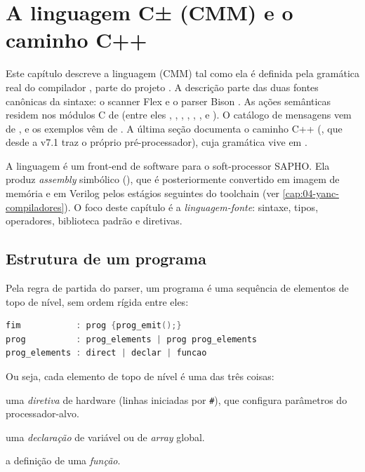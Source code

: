 \chapter{A linguagem C± (CMM) e o caminho C++}
\label{cap:03-linguagem-cmm}

Este capítulo descreve a linguagem \cmm{} (CMM) tal como ela é definida pela
gramática real do compilador , parte do projeto . A
descrição parte das duas fontes canônicas da sintaxe: o scanner Flex
 e o parser Bison
. As ações semânticas residem nos
módulos C de  (entre eles
, , , ,
, ,  e ).
O catálogo de mensagens vem de , e os
exemplos vêm de . A última seção documenta o
caminho C++ (, que desde a v7.1 traz o próprio pré-processador), cuja
gramática vive em
.

\begin{nota}
A linguagem \cmm{} é um front-end de software para o soft-processor SAPHO. Ela
produz \emph{assembly} simbólico (), que é posteriormente convertido
em imagem de memória e em Verilog pelos estágios seguintes do toolchain (ver
\autoref{cap:04-yanc-compiladores}). O foco deste capítulo é a \emph{linguagem-fonte}:
sintaxe, tipos, operadores, biblioteca padrão e diretivas.
\end{nota}

\section{Estrutura de um programa \cmm{}}
\label{sec:cmm-estrutura}

Pela regra de partida do parser, um programa \cmm{} é uma sequência de
elementos de topo de nível, sem ordem rígida entre eles:

\begin{lstlisting}[language=C]
fim           : prog {prog_emit();}
prog          : prog_elements | prog prog_elements
prog_elements : direct | declar | funcao
\end{lstlisting}

Ou seja, cada elemento de topo de nível é uma das três coisas:

\begin{description}[leftmargin=2.2em]
  \item[\code{direct}] uma \emph{diretiva} de hardware (linhas iniciadas por
  \texttt{\#}), que configura parâmetros do processador-alvo.
  \item[\code{declar}] uma \emph{declaração} de variável ou de \emph{array}
  global.
  \item[\code{funcao}] a definição de uma \emph{função}.
\end{description}

